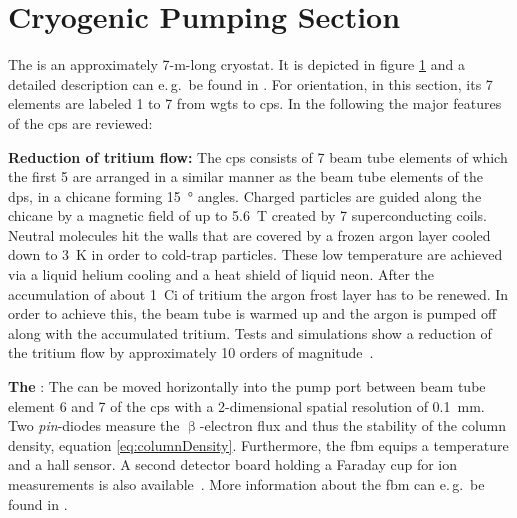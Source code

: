 \section{Cryogenic Pumping Section}
\label{sec:katrinExpSetupCryoPumpingSection}
\begin{figure}[t]
 \label{fig:katrinExpSetupCryoPumpingSection}
\end{figure}
The  is an approximately 7-m-long cryostat. It is depicted in figure \ref{fig:katrinExpSetupCryoPumpingSection} and a detailed description can e.\,g.~be found in \cite{Jansen2015}. For orientation, in this section, its 7 elements are labeled 1 to 7 from \gls{wgts} to \gls{cps}. In the following the major features of the \gls{cps} are reviewed:

{\par\textbf{Reduction of tritium flow:}
The \gls{cps} consists of 7 beam tube elements of which the first 5 are arranged in a similar manner as the beam tube elements of the \gls{dps}, in a chicane forming \SI{15}{\degree} angles. Charged particles are guided along the chicane by a magnetic field of up to \SI{5.6}{T} created by 7 superconducting coils. Neutral molecules hit the walls that are covered by a frozen argon layer cooled down to \SI{3}{K} in order to cold-trap particles. These low temperature are achieved via a liquid helium cooling and a heat shield of liquid neon. After the accumulation of about \SI{1}{Ci} of tritium the argon frost layer has to be renewed. In order to achieve this, the beam tube is warmed up and the argon is pumped off along with the accumulated tritium. Tests and simulations show a reduction of the tritium flow by approximately 10 orders of magnitude~\cite{Jansen2015}.}

{\par\textbf{The }: 
The  can be moved horizontally into the pump port between beam tube element 6 and 7 of the \gls{cps} with a 2-dimensional spatial resolution of \SI{0.1}{mm}. Two \textit{pin}-diodes measure the $\upbeta$-electron flux and thus the stability of the column density, equation \eqref{eq:columnDensity}. Furthermore, the \gls{fbm} equips a temperature and a hall sensor. A second detector board holding a Faraday cup for ion measurements is also available~\cite{Klein2019}. More information about the \gls{fbm} can e.\,g.~be found in \cite{Ellinger2017}.}

